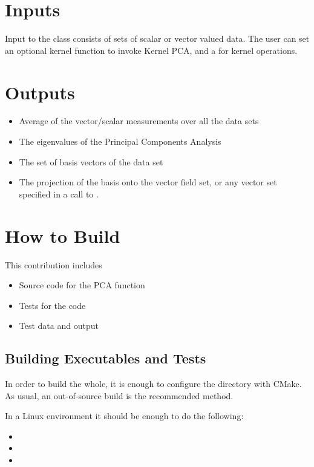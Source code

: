 \documentclass{InsightArticle}
\begin{document}
\section{Inputs}

Input to the class consists of sets of scalar or vector valued data.
The user can set an optional kernel
function to invoke Kernel PCA, and a  for
kernel operations.  

\section{Outputs}

\begin{itemize}
\item Average of the vector/scalar measurements over all the data sets
\item The eigenvalues of the Principal Components Analysis
\item The set of basis vectors of the data set
\item The projection of the basis onto the vector field set, or any vector set
specified in a call to .
\end{itemize}

\section{How to Build}

This contribution includes

\begin{itemize}
\item Source code for the PCA function
\item Tests for the code
\item Test data and output
\end{itemize}

\subsection{Building Executables and Tests}

In order to build the whole, it is enough to configure the directory with
CMake. As usual, an out-of-source build is the recommended method.

In a Linux environment it should be enough to do the following:

\begin{itemize}
\item {}
\item {}
\item {}
\end{itemize}
\end{document}
